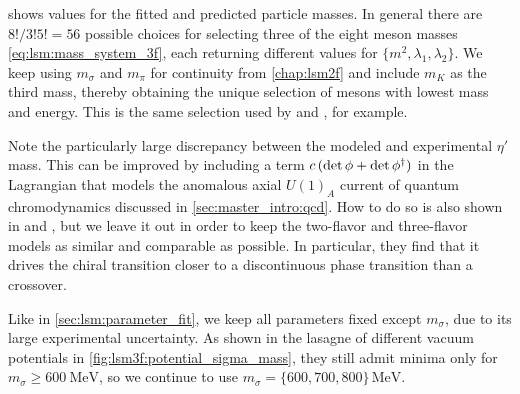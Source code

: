  shows values for the fitted and predicted particle masses.
In general there are $8!/3!5! = 56$ possible choices for selecting three of the eight meson masses \eqref{eq:lsm:mass_system_3f},
each returning different values for $\{m^2,\lambda_1,\lambda_2\}$.
We keep using $m_\sigma$ and $m_\pi$ for continuity from \cref{chap:lsm2f}
and include $m_K$ as the third mass, thereby obtaining the unique selection of mesons with lowest mass and energy.
This is the same selection used by \cite{ref:lsm3f} and \cite{ref:lsm3f_details}, for example.

Note the particularly large discrepancy between the modeled and experimental $\eta'$ mass.
This can be improved by including a term $c \, (\operatorname{det}{\phi} + \operatorname{det}{\phi^\dagger})$ in the Lagrangian
that models the anomalous axial $U(1)_A$ current of quantum chromodynamics discussed in \cref{sec:master_intro:qcd}.
How to do so is also shown in \cite{ref:lsm3f} and \cite{ref:lsm3f_details},
but we leave it out in order to keep the two-flavor and three-flavor models as similar and comparable as possible.
In particular, they find that it drives the chiral transition closer to a discontinuous phase transition than a crossover.

Like in \cref{sec:lsm:parameter_fit},
we keep all parameters fixed except $m_\sigma$, due to its large experimental uncertainty.
As shown in the lasagne of different vacuum potentials in \cref{fig:lsm3f:potential_sigma_mass},
they still admit minima only for $m_\sigma \geq \SI{600}{\mega\electronvolt}$,
so we continue to use $m_\sigma=\{600,700,800\} \, \si{\mega\electronvolt}$.

